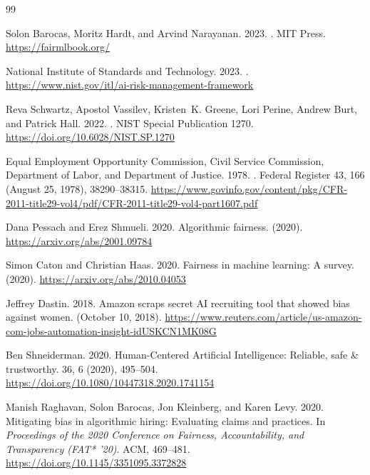 \documentclass[sigconf]{acmart}
\begin{document}

\begin{thebibliography}{99}

Solon Barocas, Moritz Hardt, and Arvind Narayanan. 2023.
.
\newblock MIT Press. \url{https://fairmlbook.org/}

National Institute of Standards and Technology. 2023.
.
\newblock \url{https://www.nist.gov/itl/ai-risk-management-framework}

Reva Schwartz, Apostol Vassilev, Kristen~K. Greene, Lori Perine, Andrew Burt, and Patrick Hall. 2022.
.
\newblock NIST Special Publication 1270. \url{https://doi.org/10.6028/NIST.SP.1270}

Equal Employment Opportunity Commission, Civil Service Commission, Department of Labor, and Department of Justice. 1978.
.
\newblock Federal Register 43, 166 (August 25, 1978), 38290--38315. \url{https://www.govinfo.gov/content/pkg/CFR-2011-title29-vol4/pdf/CFR-2011-title29-vol4-part1607.pdf}

Dana Pessach and Erez Shmueli. 2020.
\newblock Algorithmic fairness.
 (2020). \url{https://arxiv.org/abs/2001.09784}

Simon Caton and Christian Haas. 2020.
\newblock Fairness in machine learning: A survey.
 (2020). \url{https://arxiv.org/abs/2010.04053}

Jeffrey Dastin. 2018.
\newblock Amazon scraps secret AI recruiting tool that showed bias against women.
 (October 10, 2018). \url{https://www.reuters.com/article/us-amazon-com-jobs-automation-insight-idUSKCN1MK08G}

Ben Shneiderman. 2020.
\newblock Human-Centered Artificial Intelligence: Reliable, safe \& trustworthy.
 36, 6 (2020), 495--504. \url{https://doi.org/10.1080/10447318.2020.1741154}

Manish Raghavan, Solon Barocas, Jon Kleinberg, and Karen Levy. 2020.
\newblock Mitigating bias in algorithmic hiring: Evaluating claims and practices.
\newblock In {\em Proceedings of the 2020 Conference on Fairness, Accountability, and Transparency (FAT* '20)}. ACM, 469--481. \url{https://doi.org/10.1145/3351095.3372828}


\end{thebibliography}
\end{document}
